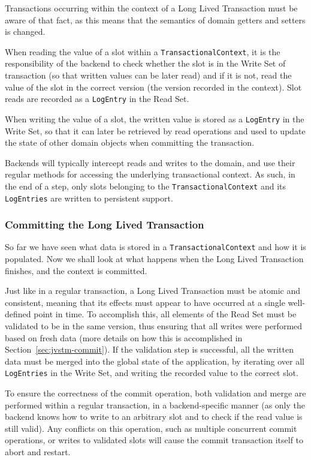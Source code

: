 \documentclass{llncs}
\begin{document}
Transactions occurring within the context of a Long Lived Transaction
must be aware of that fact, as this means that the semantics of domain
getters and setters is changed.

When reading the value of a slot within a
\texttt{TransactionalContext}, it is the responsibility of the backend
to check whether the slot is in the Write Set of transaction (so that
written values can be later read) and if it is not, read the value of
the slot in the correct version (the version recorded in the
context). Slot reads are recorded as a \texttt{LogEntry} in the Read
Set.

When writing the value of a slot, the written value is stored as a
\texttt{LogEntry} in the Write Set, so that it can later be retrieved
by read operations and used to update the state of other domain
objects when committing the transaction.

Backends will typically intercept reads and writes to the domain, and
use their regular methods for accessing the underlying transactional
context. As such, in the end of a step, only slots belonging to the
\texttt{TransactionalContext} and its \texttt{LogEntries} are written
to persistent support.

\subsubsection{Committing the Long Lived Transaction}

So far we have seen what data is stored in a
\texttt{TransactionalContext} and how it is populated. Now we shall
look at what happens when the Long Lived Transaction finishes, and the
context is committed.

Just like in a regular transaction, a Long Lived Transaction must be
atomic and consistent, meaning that its effects must appear to have
occurred at a single well-defined point in time. To accomplish this,
all elements of the Read Set must be validated to be in the same
version, thus ensuring that all writes were performed based on fresh
data (more details on how this is accomplished in
Section~\ref{sec:jvstm-commit}). If the validation step is successful,
all the written data must be merged into the global state of the
application, by iterating over all \texttt{LogEntries} in the Write
Set, and writing the recorded value to the correct slot.

To ensure the correctness of the commit operation, both validation and
merge are performed within a regular transaction, in a
backend-specific manner (as only the backend knows how to write to an
arbitrary slot and to check if the read value is still valid). Any
conflicts on this operation, such as multiple concurrent commit
operations, or writes to validated slots will cause the commit
transaction itself to abort and restart.
\end{document}
